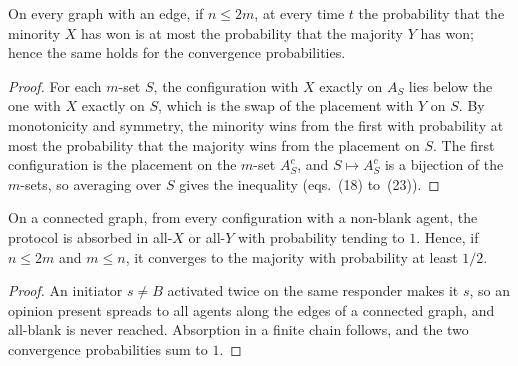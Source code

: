 \begin{theorem}\label{thm:am-graph}
\leanok{}
On every graph with an edge, if $n \le 2m$, at every time $t$ the probability that the minority
$X$ has won is at most the probability that the majority $Y$ has won; hence the same holds for the
convergence probabilities.
\end{theorem}
\begin{proof}\leanok
For each $m$-set $S$, the configuration with $X$ exactly on $A_S$ lies below the one with $X$
exactly on $S$, which is the swap of the placement with $Y$ on $S$. By monotonicity and symmetry,
the minority wins from the first with probability at most the probability that the majority wins
from the placement on $S$. The first configuration is the placement on the $m$-set $A_S^c$, and
$S \mapsto A_S^c$ is a bijection of the $m$-sets, so averaging over $S$ gives the inequality
(eqs.~(18) to~(23)).
\end{proof}

\begin{theorem}\label{thm:am-half}
\leanok{}
On a connected graph, from every configuration with a non-blank agent, the protocol is absorbed in
all-$X$ or all-$Y$ with probability tending to $1$. Hence, if $n \le 2m$ and $m \le n$, it converges
to the majority with probability at least $1/2$.
\end{theorem}
\begin{proof}\leanok
An initiator $s \ne B$ activated twice on the same responder makes it $s$, so an opinion present
spreads to all agents along the edges of a connected graph, and all-blank is never reached.
Absorption in a finite chain follows, and the two convergence probabilities sum to $1$.
\end{proof}

